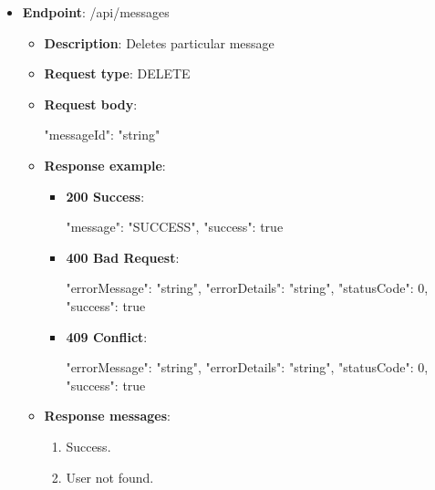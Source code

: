 \begin{itemize}
    \item \textbf{Endpoint}: /api/messages
    \begin{itemize}
        \item \textbf{Description}: Deletes particular message
        \item \textbf{Request type}: DELETE
        \item \textbf{Request body}:
        \begin{spverbatim}
        {
            "messageId": "string"
        }
        \end{spverbatim}
        \item \textbf{Response example}:
        \begin{itemize}
            \item \textbf{200 Success}:
            \begin{spverbatim}
            {
                "message": "SUCCESS",
                "success": true
            }
            \end{spverbatim}
            \item \textbf{400 Bad Request}:
            \begin{spverbatim}
            {
                "errorMessage": "string",
                "errorDetails": "string",
                "statusCode": 0,
                "success": true
            }
            \end{spverbatim}
            \item \textbf{409 Conflict}:
            \begin{spverbatim}
            {
                "errorMessage": "string",
                "errorDetails": "string",
                "statusCode": 0,
                "success": true
            }
            \end{spverbatim}
        \end{itemize}
        \item \textbf{Response messages}:
        \begin{enumerate}
            \item Success.
            \item User not found.
        \end{enumerate}
    \end{itemize}
\end{itemize}